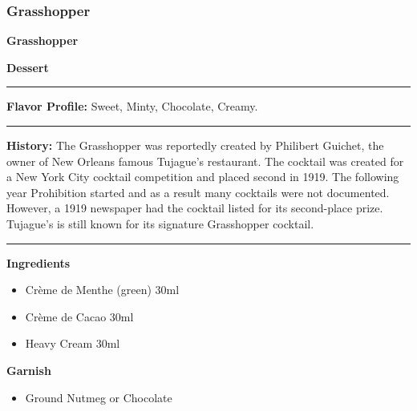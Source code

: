 \subsubsection{Grasshopper}
\noindent
\begin{minipage}{.49\textwidth}
    \noindent\textbf{\LARGE Grasshopper}
\end{minipage}
\hspace{.02\textwidth}
\begin{minipage}{.49\textwidth}
    \raggedleft
    \textbf{\large Dessert}\\
\end{minipage}
\vspace{.5em}\hrule\vspace{.5em}
\noindent
\textbf{\large Flavor Profile:} Sweet, Minty, Chocolate, Creamy.
\vspace{.5em}\hrule\vspace{.5em}
\noindent
\textbf{\large History:} The Grasshopper was reportedly created by Philibert Guichet, the owner of New Orleans famous Tujague's restaurant. The cocktail was created for a New York City cocktail competition and placed second in 1919. The following year Prohibition started and as a result many cocktails were not documented. However, a 1919 newspaper had the cocktail listed for its second-place prize. Tujague's is still known for its signature Grasshopper cocktail.
\vspace{.5em}\hrule\vspace{.5em}
\noindent
\begin{minipage}[t]{.49\textwidth}
    \noindent
    \textbf{\large Ingredients}
    \begin{itemize}
        \item Crème de Menthe (green) 30ml
        \item Crème de Cacao 30ml
        \item Heavy Cream 30ml
    \end{itemize}
    \noindent
    \textbf{\large Garnish}
    \begin{itemize}
        \item Ground Nutmeg or Chocolate
    \end{itemize}
\end{minipage}
